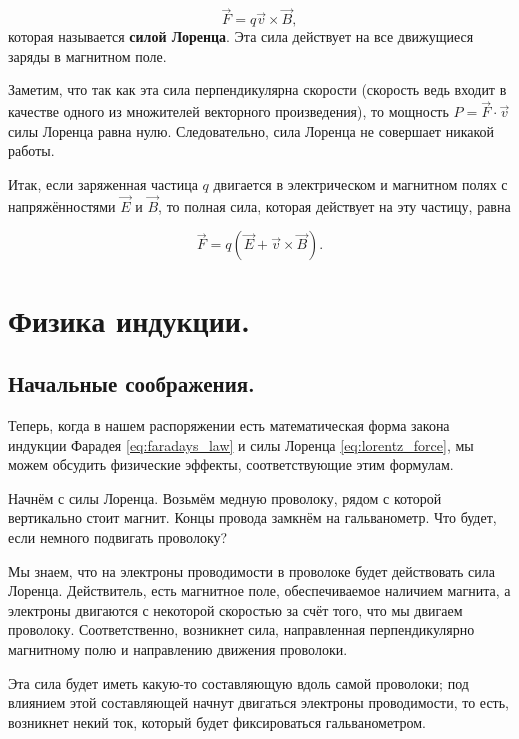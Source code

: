 \documentclass[a4paper,12pt]{article}
\numberwithin{equation}{section}
\begin{document}
\begin{equation}
  \label{eq:lorentz_force}
  \vec{F} = q \vec{v} \times \vec{B},
\end{equation}
которая называется \textbf{силой Лоренца}. Эта сила действует на все
движущиеся заряды в магнитном поле. 

Заметим, что так как эта сила перпендикулярна скорости (скорость ведь
входит в качестве одного из множителей векторного произведения), то
мощность $P = \vec{F} \cdot \vec{v} $ силы Лоренца равна
нулю. Следовательно, сила Лоренца не совершает никакой работы. 

Итак, если заряженная частица $q$ двигается в электрическом и
магнитном полях с напряжённостями $\vec{E}$ и $\vec{B}$, то полная
сила, которая действует на эту частицу, равна

\begin{equation}
  \label{eq:lorentz_force_full}
  \vec{F} = q \left( \vec{E} + \vec{v} \times \vec{B} \right). 
\end{equation}

\section{Физика индукции.}
\label{sec:induction}

\subsection{Начальные соображения.}
\label{sec:induction_start}



Теперь, когда в нашем распоряжении есть математическая форма закона
индукции Фарадея \eqref{eq:faradays_law} и силы Лоренца
\eqref{eq:lorentz_force}, мы можем обсудить физические эффекты,
соответствующие этим формулам. 

Начнём с силы Лоренца. Возьмём медную проволоку, рядом с которой
вертикально стоит магнит. Концы провода замкнём на гальванометр. Что
будет, если немного подвигать проволоку? 

Мы знаем, что на электроны проводимости в проволоке будет действовать
сила Лоренца. Действитель, есть магнитное поле, обеспечиваемое
наличием магнита, а электроны двигаются с некоторой скоростью за счёт
того, что мы двигаем проволоку. Соответственно, возникнет сила,
направленная перпендикулярно магнитному полю и направлению движения
проволоки. 

Эта сила будет иметь какую-то составляющую вдоль самой проволоки; под
влиянием этой составляющей начнут двигаться электроны проводимости, то
есть, возникнет некий ток, который будет фиксироваться
гальванометром. 
\end{document}
